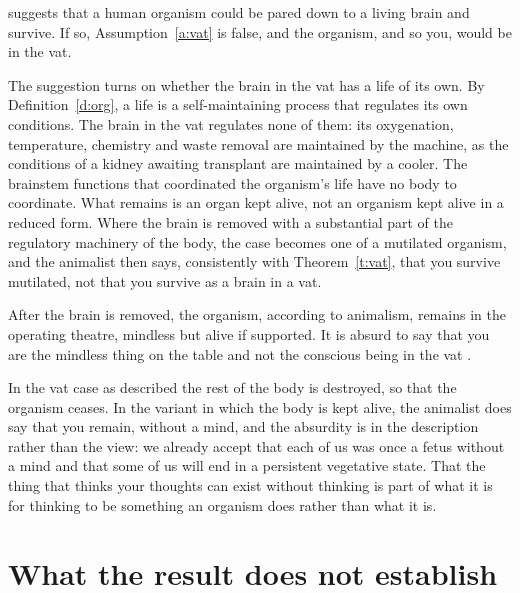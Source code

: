 \documentclass{situationist-preprint}
\begin{document}
\begin{objection}
\citet{vanInwagen1990} suggests that a human organism could be pared down to a living brain and survive. If so, Assumption~\ref{a:vat} is false, and the organism, and so you, would be in the vat.
\end{objection}

\begin{reply}
The suggestion turns on whether the brain in the vat has a life of its own. By Definition~\ref{d:org}, a life is a self-maintaining process that regulates its own conditions. The brain in the vat regulates none of them: its oxygenation, temperature, chemistry and waste removal are maintained by the machine, as the conditions of a kidney awaiting transplant are maintained by a cooler. The brainstem functions that coordinated the organism's life have no body to coordinate. What remains is an organ kept alive, not an organism kept alive in a reduced form. Where the brain is removed with a substantial part of the regulatory machinery of the body, the case becomes one of a mutilated organism, and the animalist then says, consistently with Theorem~\ref{t:vat}, that you survive mutilated, not that you survive as a brain in a vat.
\end{reply}

\begin{objection}
After the brain is removed, the organism, according to animalism, remains in the operating theatre, mindless but alive if supported. It is absurd to say that you are the mindless thing on the table and not the conscious being in the vat \citep{Johnston2007}.
\end{objection}

\begin{reply}
In the vat case as described the rest of the body is destroyed, so that the organism ceases. In the variant in which the body is kept alive, the animalist does say that you remain, without a mind, and the absurdity is in the description rather than the view: we already accept that each of us was once a fetus without a mind and that some of us will end in a persistent vegetative state. That the thing that thinks your thoughts can exist without thinking is part of what it is for thinking to be something an organism does rather than what it is.
\end{reply}

\section{What the result does not establish}\label{s:not}
\end{document}
